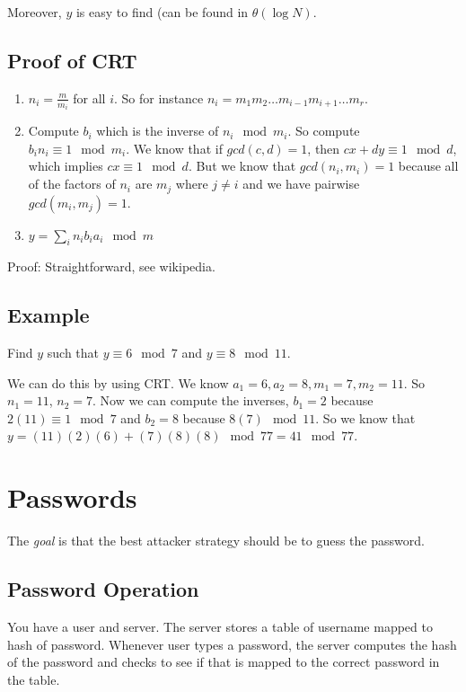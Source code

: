 \documentclass[psamsfonts]{amsart}
\begin{document}
Moreover, $y$ is easy to find (can be found in $\theta(\log N)$. 

\subsection{Proof of CRT}

\begin{enumerate}
  \item $n_i = \frac{m}{m_i}$ for all $i$. So for instance $n_i = m_1 m_2 \ldots m_{i-1} m_{i+1} \ldots m_r$. 
  \item Compute $b_i$ which is the inverse of $n_i \mod m_i$. So compute $b_i n_i \equiv 1 \mod m_i$. 
  We know that if $gcd(c,d) = 1$, then $cx + dy \equiv 1 \mod{d}$, which implies $cx \equiv 1 \mod{d}$. But we know that $gcd(n_i, m_i) = 1$ because all of the factors of $n_i$ are $m_j$ where $j \neq i$ and we have pairwise $gcd(m_i, m_j) = 1$.
  \item $y = \sum_i n_i b_i a_i \mod{m}$
\end{enumerate}

  Proof: Straightforward, see wikipedia.

\subsection{Example}

  Find $y$ such that $y \equiv 6 \mod 7$ and $y \equiv 8 \mod{11}$.

  We can do this by using CRT. We know $a_1 = 6, a_2 = 8, m_1 = 7, m_2 = 11$. So $n_1 = 11$, $n_2 = 7$. Now we can compute the inverses, $b_1 = 2$ because $2 (11) \equiv 1 \mod{7}$ and $b_2 = 8$ because $8 (7) \mod{11}$. So we know that $y = (11)(2)(6) + (7)(8)(8) \mod 77 = 41 \mod 77$.

\section{Passwords}

The \emph{goal} is that the best attacker strategy should be to guess the password.

\subsection{Password Operation}

You have a user and server. The server stores a table of username mapped to hash of password. Whenever user types a password, the server computes the hash of the password and checks to see if that is mapped to the correct password in the table.
\end{document}
